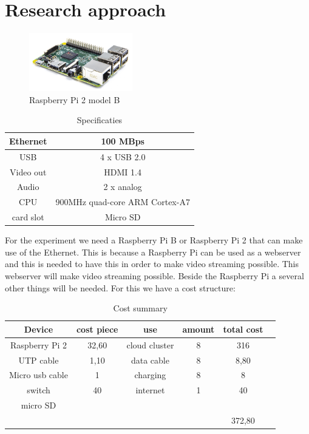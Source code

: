 \documentclass{sig-alternate-br}
\begin{document}
\section{Research approach}
\begin{figure}[H]
	\centering 
	\includegraphics[width=0.4\textwidth]{Pi2ModB1GB_-comp.jpeg}
	\caption{Raspberry Pi 2 model B}
	\label{fig:raspberry} %
\end{figure}
\begin{table}[H]
	\centering \caption{Specificaties}
	\begin{tabular}{|c|c|} \hline
		Ethernet & 100 MBps \\ \hline
		USB & 4 x USB 2.0 \\ \hline
		Video out & HDMI 1.4 \\ \hline
		Audio & 2 x analog \\ \hline
		CPU & 900MHz quad-core ARM Cortex-A7 \\ \hline
		card slot & Micro SD  \\ \hline
	\end{tabular}
	\label{tab:Specificaties}
\end{table}
For the experiment we need a Raspberry Pi B or Raspberry Pi 2 that can make use of the Ethernet. This is because a Raspberry Pi can be used as a webserver and this is needed to have this in order to make video streaming possible. This webserver will make video streaming possible. Beside the Raspberry Pi a several other things will be needed. For this we have a cost structure:
\begin{table}[H]
	\centering 
	\caption{Cost summary \cite{iapc}}
	\begin{tabular}{|c|c|c|c|c|p{5cm}} \hline
		Device 			& cost piece	& use 			& amount & total cost \\ \hline
		Raspberry Pi 2 	& 32,60 		& cloud cluster & 8 & 316  \\ \hline
		UTP cable		& 1,10 			& data cable 	& 8 & 8,80  \\ \hline
		Micro usb cable	& 1 			& charging 		& 8 & 8  \\ \hline
		switch 			& 40 			& internet 		& 1 & 40  \\ \hline
		micro SD 		& 				& 				& 	& \\ \hline
		& & & &  372,80  \\ \hline
	\end{tabular}
	\label{tab:cost}
\end{table}
\end{document}
